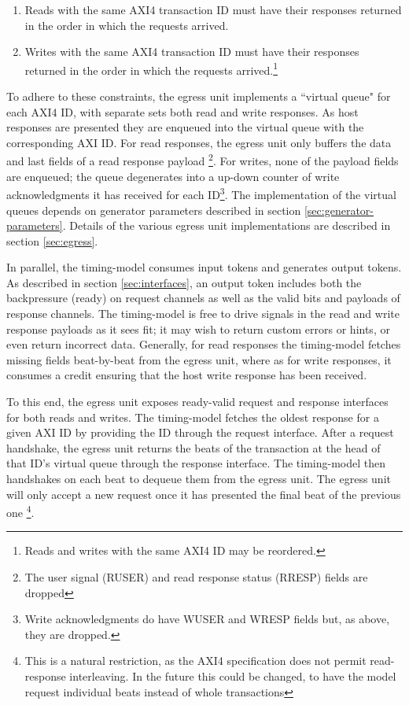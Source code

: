 \begin{enumerate}

    \item Reads with the same AXI4 transaction ID must have their responses returned in the
        order in which the requests arrived.

    \item Writes with the same AXI4 transaction ID must have their responses returned in
        the order in which the requests arrived.\footnote{Reads and writes with
        the same AXI4 ID may be reordered.}

\end{enumerate}

To adhere to these constraints, the egress unit implements a ``virtual queue"
for each AXI4 ID, with separate sets both read and write responses. As host
responses are presented they are enqueued into the virtual queue with the
corresponding AXI ID. For read responses, the egress unit only buffers the data
and last fields of a read response payload \footnote{The user signal (RUSER)
and read response status (RRESP) fields are dropped}. For writes, none of the
payload fields are enqueued; the queue degenerates into a up-down counter of
write acknowledgments it has received for each ID\footnote{Write
acknowledgments do have WUSER and WRESP fields but, as above, they are
dropped.}. The implementation of the virtual queues depends on generator
parameters described in section \ref{sec:generator-parameters}. Details of the
various egress unit implementations are described in section \ref{sec:egress}.

In parallel, the timing-model consumes input tokens and generates output
tokens. As described in section \ref{sec:interfaces}, an output token includes
both the backpressure (ready) on request channels as well as the valid bits and
payloads of response channels. The timing-model is free to drive signals in the
read and write response payloads as it sees fit; it may wish to return custom
errors or hints, or even return incorrect data. Generally, for read responses
the timing-model fetches missing fields beat-by-beat from the egress unit, where
as for write responses, it consumes a credit ensuring that the host write
response has been received.

To this end, the egress unit exposes ready-valid request and response
interfaces for both reads and writes. The timing-model fetches the oldest
response for a given AXI ID by providing the ID through the request interface.
After a request handshake, the egress unit returns the beats of the transaction
at the head of that ID's virtual queue through the response interface. The
timing-model then handshakes on each beat to dequeue them from the egress unit.
The egress unit will only accept a new request once it has presented the final
beat of the previous one \footnote{This is a natural restriction, as the AXI4
specification does not permit read-response interleaving. In the future this
could be changed, to have the model request individual beats instead of whole
transactions}.

